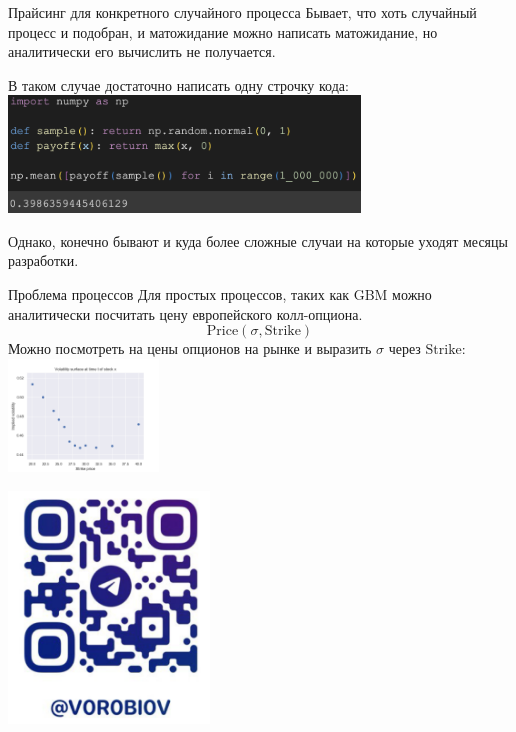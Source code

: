 \documentclass{beamer}
\begin{document}
    \begin{frame}{Прайсинг для конкретного случайного процесса}
        Бывает, что хоть случайный процесс и подобран, и матожидание можно написать матожидание, но аналитически его вычислить не получается.

        В таком случае достаточно написать одну строчку кода:
        \includegraphics[width=0.7\textwidth]{code.png}

        Однако, конечно бывают и куда более сложные случаи на которые уходят месяцы разработки.

    \end{frame}

    \begin{frame}{Проблема  процессов}
        Для простых процессов, таких как GBM можно аналитически посчитать цену европейского колл-опциона.
        \[
            \mathrm{Price}\left(\sigma, \mathrm{Strike}\right)
        \]
        Можно посмотреть на цены опционов на рынке и выразить $\sigma$ через $\mathrm{Strike}$:
        \includegraphics[width=0.3\textwidth]{implied.png}
    \end{frame}

    \begin{frame}
        \center
        \includegraphics[width=0.4\textwidth]{me.png}
    \end{frame}
\end{document}
